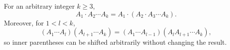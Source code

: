 For an arbitrary integer $k \geq 3$,
$$A_1 \cdot A_2 \cdots A_k = A_1 \cdot (A_2 \cdot A_3 \cdots A_k).$$
Moreover, for $1 < l < k$,
$$(A_1 \cdots A_l)(A_{l+1} \cdots A_k) = (A_1 \cdots A_{l-1})(A_l A_{l+1} \cdots A_k),$$
so inner parentheses can be shifted arbitrarily without changing the result.
